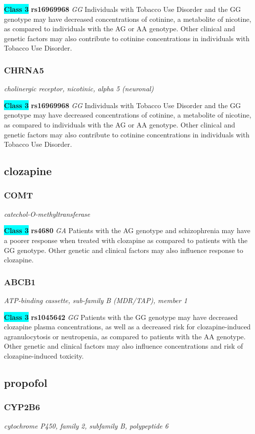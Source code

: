 \documentclass{report}
\begin{document}
\textbf{\colorbox{cyan} {Class 3}} \textbf{ rs16969968 } \textit{ GG }
Individuals with Tobacco Use Disorder and the GG genotype may have decreased concentrations of cotinine, a metabolite of nicotine, as compared to individuals with the AG or AA genotype. Other clinical and genetic factors may also contribute to cotinine concentrations in individuals with Tobacco Use Disorder.\newline\subsubsection{ CHRNA5 }
\textit{ cholinergic receptor, nicotinic, alpha 5 (neuronal) }

\textbf{\colorbox{cyan} {Class 3}} \textbf{ rs16969968 } \textit{ GG }
Individuals with Tobacco Use Disorder and the GG genotype may have decreased concentrations of cotinine, a metabolite of nicotine, as compared to individuals with the AG or AA genotype. Other clinical and genetic factors may also contribute to cotinine concentrations in individuals with Tobacco Use Disorder.\newline\subsection{ clozapine }\subsubsection{ COMT }
\textit{ catechol-O-methyltransferase }

\textbf{\colorbox{cyan} {Class 3}} \textbf{ rs4680 } \textit{ GA }
Patients with the AG genotype and schizophrenia may have a poorer response when treated with clozapine as compared to patients with the GG genotype. Other genetic and clinical factors may also influence response to clozapine.\newline\subsubsection{ ABCB1 }
\textit{ ATP-binding cassette, sub-family B (MDR/TAP), member 1 }

\textbf{\colorbox{cyan} {Class 3}} \textbf{ rs1045642 } \textit{ GG }
Patients with the GG genotype may have decreased clozapine plasma concentrations, as well as a decreased risk for clozapine-induced agranulocytosis or neutropenia, as compared to patients with the AA genotype. Other genetic and clinical factors may also influence concentrations and risk of clozapine-induced toxicity. \newline\subsection{ propofol }\subsubsection{ CYP2B6 }
\textit{ cytochrome P450, family 2, subfamily B, polypeptide 6 }
\end{document}
